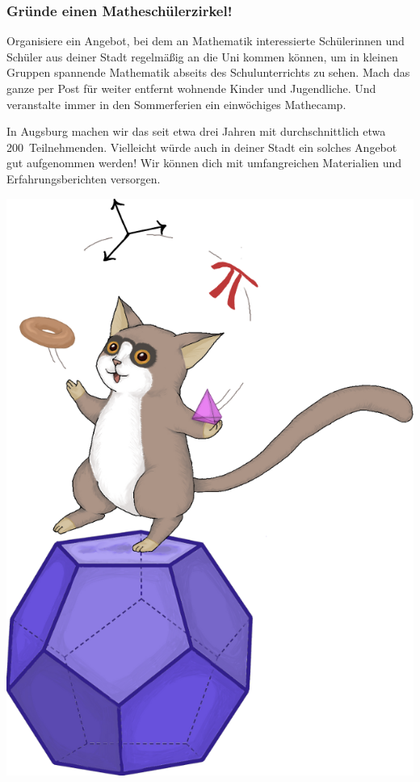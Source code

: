 \documentclass[12pt,utf8,notheorems,compress,t]{beamer}
\renewcommand{\_}{\mathpunct{.}}
\newcommand{\?}{\,{:}\,}
\newcounter{framenumberpreappendix}
\newcommand{\backupend}{
  \addtocounter{framenumberpreappendix}{-\value{framenumber}}
  \addtocounter{framenumber}{\value{framenumberpreappendix}} 
}
\begin{document}
\begin{frame}\frametitle{Gründe einen Matheschülerzirkel!}
  \footnotesize\justifying
  Organisiere ein Angebot, bei dem an Mathematik interessierte Schülerinnen und
  Schüler aus deiner Stadt regelmäßig an die Uni kommen können, um in kleinen
  Gruppen spannende Mathematik abseits des Schulunterrichts zu sehen. Mach das
  ganze per Post für weiter entfernt wohnende Kinder und Jugendliche. Und
  veranstalte immer in den Sommerferien ein einwöchiges Mathecamp.

  In Augsburg machen wir das seit etwa drei Jahren mit durchschnittlich etwa
  200~Teilnehmenden. Vielleicht würde auch in deiner Stadt ein solches Angebot
  gut aufgenommen werden! Wir können dich mit umfangreichen Materialien und
  Erfahrungsberichten versorgen.
  \begin{center}\href{http://www.math.uni-augsburg.de/schueler/mathezirkel/index.html}{\phantom{aaaaaa}\includegraphics[scale=0.1]{images/mathezirkel}}\end{center}
\end{frame}

\backupend
\end{document}
